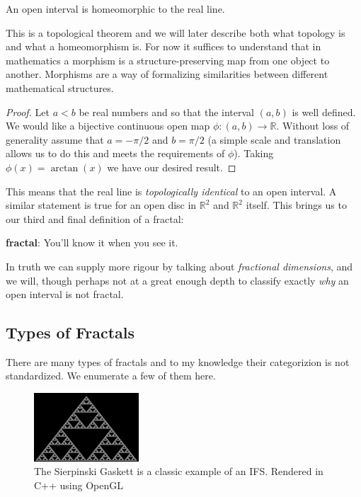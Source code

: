 \documentclass[11pt,oneside,final]{article}
\begin{document}
\begin{thm}
	An open interval is homeomorphic to the real line.
\end{thm}
This is a topological theorem and we will later describe both what topology
is and what a homeomorphism is. For now it suffices to understand that in 
mathematics a morphism is a structure-preserving map from one object to another.
Morphisms are a way of formalizing similarities between different mathematical
structures.
\begin{proof}
	Let \(a < b\) be real numbers and so that the interval \((a,b)\) is well
	defined. We would like a bijective continuous open map \(\phi : (a,b)
	\rightarrow \mathbb R\). Without loss of generality assume that \(a =
	-\pi/2\) and \(b = \pi/2\) (a simple scale and translation allows us to do
	this and meets the requirements of \(\phi\)). Taking \(\phi(x) =
	\arctan(x)\) we have our desired result.
\end{proof}

This means that the real line is \emph{topologically identical} to an open
interval. A similar statement is true for an open disc in \(\mathbb R^2\) and
\(\mathbb R^2\) itself.  This brings us to our third and final definition of a
fractal:

\begin{dfn}
	\textbf{fractal}: You'll know it when you see it.
\end{dfn}

In truth we can supply more rigour by talking about \emph{fractional
dimensions}, and we will, though perhaps not at a great enough depth to
classify exactly {\em why} an open interval is not fractal.


\subsection{Types of Fractals}
There are many types of fractals and to my knowledge their categorizion is not
standardized. We enumerate a few of them here.\\



\begin{figure}
	\includegraphics[width=0.35\textwidth]{sierpinski_32000-1}
	\caption{The Sierpinski Gaskett is a classic example of an IFS. Rendered in
	C++ using OpenGL}
\end{figure}
\end{document}
